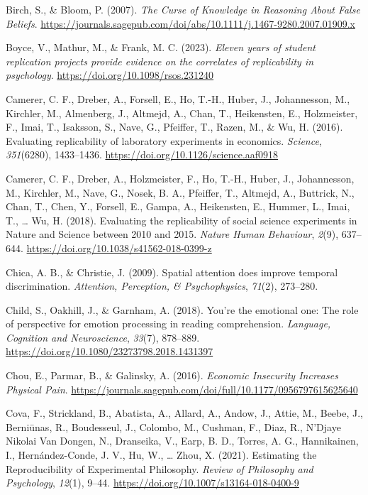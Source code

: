 \documentclass[
  english,
  a4paper,
]{article}
\newlength{\cslhangindent}
\newenvironment{CSLReferences}[2] %
{\begin{list}{}{%
			\setlength{\itemindent}{0pt}
			\setlength{\leftmargin}{0pt}
			\setlength{\parsep}{0pt}
			\ifodd #1
			\setlength{\leftmargin}{\cslhangindent}
			\setlength{\itemindent}{-1\cslhangindent}
			\fi
			\setlength{\itemsep}{#2\baselineskip}}}
	{\end{list}}
\begin{document}
\label{refs}
\begin{CSLReferences}{1}{0}
Birch, S., \& Bloom, P. (2007). \emph{The {Curse} of {Knowledge} in {Reasoning About False Beliefs}}. \url{https://journals.sagepub.com/doi/abs/10.1111/j.1467-9280.2007.01909.x}

Boyce, V., Mathur, M., \& Frank, M. C. (2023). \emph{Eleven years of student replication projects provide evidence on the correlates of replicability in psychology}. \url{https://doi.org/10.1098/rsos.231240}

Camerer, C. F., Dreber, A., Forsell, E., Ho, T.-H., Huber, J., Johannesson, M., Kirchler, M., Almenberg, J., Altmejd, A., Chan, T., Heikensten, E., Holzmeister, F., Imai, T., Isaksson, S., Nave, G., Pfeiffer, T., Razen, M., \& Wu, H. (2016). Evaluating replicability of laboratory experiments in economics. \emph{Science}, \emph{351}(6280), 1433--1436. \url{https://doi.org/10.1126/science.aaf0918}

Camerer, C. F., Dreber, A., Holzmeister, F., Ho, T.-H., Huber, J., Johannesson, M., Kirchler, M., Nave, G., Nosek, B. A., Pfeiffer, T., Altmejd, A., Buttrick, N., Chan, T., Chen, Y., Forsell, E., Gampa, A., Heikensten, E., Hummer, L., Imai, T., \ldots{} Wu, H. (2018). Evaluating the replicability of social science experiments in {Nature} and {Science} between 2010 and 2015. \emph{Nature Human Behaviour}, \emph{2}(9), 637--644. \url{https://doi.org/10.1038/s41562-018-0399-z}

Chica, A. B., \& Christie, J. (2009). Spatial attention does improve temporal discrimination. \emph{Attention, Perception, \& Psychophysics}, \emph{71}(2), 273--280.

Child, S., Oakhill, J., \& Garnham, A. (2018). You're the emotional one: The role of perspective for emotion processing in reading comprehension. \emph{Language, Cognition and Neuroscience}, \emph{33}(7), 878--889. \url{https://doi.org/10.1080/23273798.2018.1431397}

Chou, E., Parmar, B., \& Galinsky, A. (2016). \emph{Economic {Insecurity Increases Physical Pain}}. \url{https://journals.sagepub.com/doi/full/10.1177/0956797615625640}

Cova, F., Strickland, B., Abatista, A., Allard, A., Andow, J., Attie, M., Beebe, J., Berniūnas, R., Boudesseul, J., Colombo, M., Cushman, F., Diaz, R., N'Djaye Nikolai Van Dongen, N., Dranseika, V., Earp, B. D., Torres, A. G., Hannikainen, I., Hernández-Conde, J. V., Hu, W., \ldots{} Zhou, X. (2021). Estimating the {Reproducibility} of {Experimental Philosophy}. \emph{Review of Philosophy and Psychology}, \emph{12}(1), 9--44. \url{https://doi.org/10.1007/s13164-018-0400-9}


\end{CSLReferences}
\end{document}
